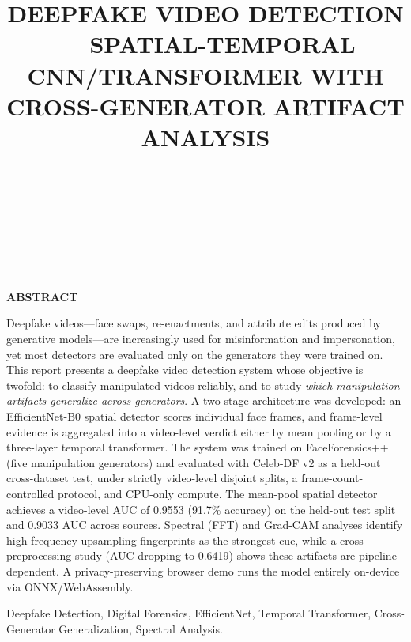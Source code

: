 \documentclass[conference]{IEEEtran}
\makeatletter
\renewenvironment{abstract}{%
  \par\addvspace{0.5\baselineskip}%
  \bgroup\centering\@IEEEabskeysecsize\textbf{ABSTRACT}\par\addvspace{0.5\baselineskip}\egroup%
  \quotation\@IEEEabskeysecsize%
}{\endquotation\par}
\makeatother
\begin{document}
\title{DEEPFAKE VIDEO DETECTION --- SPATIAL-TEMPORAL CNN/TRANSFORMER WITH CROSS-GENERATOR ARTIFACT ANALYSIS}

\author{\\[2mm]
\\[1mm]
\\[1mm]
\\[1mm]
\\[2mm]
}

\maketitle

\begin{abstract}
Deepfake videos---face swaps, re-enactments, and attribute edits produced by generative models---are increasingly used for misinformation and impersonation, yet most detectors are evaluated only on the generators they were trained on. This report presents a deepfake video detection system whose objective is twofold: to classify manipulated videos reliably, and to study \emph{which manipulation artifacts generalize across generators}. A two-stage architecture was developed: an EfficientNet-B0 spatial detector scores individual face frames, and frame-level evidence is aggregated into a video-level verdict either by mean pooling or by a three-layer temporal transformer. The system was trained on FaceForensics++ (five manipulation generators) and evaluated with Celeb-DF v2 as a held-out cross-dataset test, under strictly video-level disjoint splits, a frame-count-controlled protocol, and CPU-only compute. The mean-pool spatial detector achieves a video-level AUC of 0.9553 (91.7\% accuracy) on the held-out test split and 0.9033 AUC across sources. Spectral (FFT) and Grad-CAM analyses identify high-frequency upsampling fingerprints as the strongest cue, while a cross-preprocessing study (AUC dropping to 0.6419) shows these artifacts are pipeline-dependent. A privacy-preserving browser demo runs the model entirely on-device via ONNX/WebAssembly.
\end{abstract}

\begin{IEEEkeywords}
Deepfake Detection, Digital Forensics, EfficientNet, Temporal Transformer, Cross-Generator Generalization, Spectral Analysis.
\end{IEEEkeywords}
\end{document}
